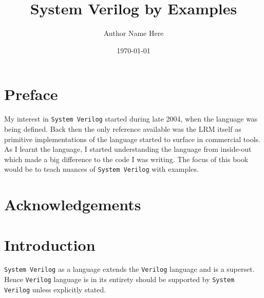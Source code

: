 \documentclass[11pt]{book}              %
\title{\bf System Verilog by Examples}    %
\author{Author Name Here}              %
\date{\today}                           %
\begin{document}



\frontmatter                            %
\maketitle                              %
\tableofcontents                        %

\chapter{Preface}
My interest in \texttt{System Verilog} started during late 2004, when
the language was being defined. Back then the only reference available
was the LRM itself as primitive implementations of the language
started to surface in commercial tools. As I learnt the language, I
started understanding the language from inside-out which made a big
difference to the code I was writing. The focus of this book would be
to teach nuances of \texttt{System Verilog} with examples.

\chapter{Acknowledgements}

\chapter{Introduction}                %
\texttt{System Verilog} as a language extends the \texttt{Verilog}
language and is a superset. Hence \texttt{Verilog} language is in its
entirety should be supported by \texttt{System Verilog} unless
explicitly stated.

\mainmatter                             %



\end{document}
